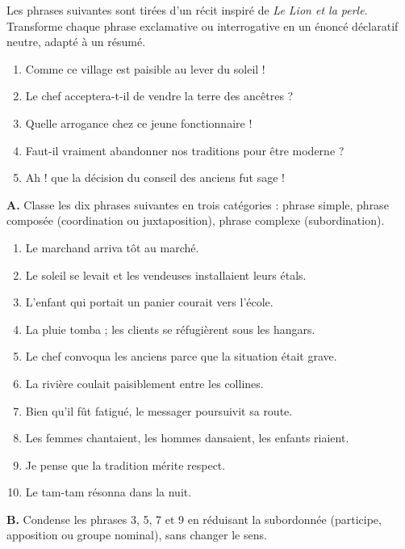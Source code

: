\documentclass[11pt]{article}
\begin{document}
\begin{exercice}
Les phrases suivantes sont tirées d'un récit inspiré de \emph{Le Lion et la perle}. Transforme chaque phrase exclamative ou interrogative en un énoncé déclaratif neutre, adapté à un résumé.
\begin{enumerate}
\item Comme ce village est paisible au lever du soleil !
\item Le chef acceptera-t-il de vendre la terre des ancêtres ?
\item Quelle arrogance chez ce jeune fonctionnaire !
\item Faut-il vraiment abandonner nos traditions pour être moderne ?
\item Ah ! que la décision du conseil des anciens fut sage !
\end{enumerate}
\end{exercice}

\begin{exercice}
\textbf{A.} Classe les dix phrases suivantes en trois catégories : phrase simple, phrase composée (coordination ou juxtaposition), phrase complexe (subordination).
\begin{enumerate}
\item Le marchand arriva tôt au marché.
\item Le soleil se levait et les vendeuses installaient leurs étals.
\item L'enfant qui portait un panier courait vers l'école.
\item La pluie tomba ; les clients se réfugièrent sous les hangars.
\item Le chef convoqua les anciens parce que la situation était grave.
\item La rivière coulait paisiblement entre les collines.
\item Bien qu'il fût fatigué, le messager poursuivit sa route.
\item Les femmes chantaient, les hommes dansaient, les enfants riaient.
\item Je pense que la tradition mérite respect.
\item Le tam-tam résonna dans la nuit.
\end{enumerate}
\textbf{B.} Condense les phrases 3, 5, 7 et 9 en réduisant la subordonnée (participe, apposition ou groupe nominal), sans changer le sens.
\end{exercice}
\end{document}
